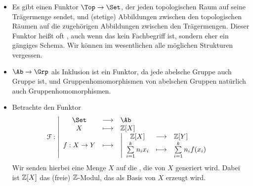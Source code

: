 \begin{example}
    \begin{itemize}
        \item Es gibt einen Funktor $\Top \to  \Set$, der jeden topologischen Raum auf seine Trägermenge sendet, und (stetige) Abbildungen zwischen den topologischen Räumen auf die zugehörigen Abbildungen zwischen den Trägermengen. Dieser Funktor heißt oft , auch wenn das kein Fachbegriff ist, sondern eher ein gängiges Schema. Wir können im wesentlichen alle möglichen Strukturen vergessen. 
        \item $\Ab \to  \Grp$ als Inklusion ist ein Funktor, da jede abelsche Gruppe auch Gruppe ist, und Gruppenhomomorphismen von abelschen Gruppen natürlich auch Gruppenhomomorphismen.
        \item Betrachte den Funktor
                \begin{equation*}
                \mathcal{F}: \left| \begin{array}{c c l} 
                \Set & \longrightarrow & \Ab \\
                X & \longmapsto &  \Z[X] \\
                f: X \to  Y &\longmapsto & 
                    \left| \begin{array}{c c l} 
                        \Z[X] & \longrightarrow & \Z[Y] \\
                        \sum\limits_{i=1}^k n_i x_i& \longmapsto	 & \sum\limits_{i=1}^k n_i f(x_i)
                \end{array} \right.
                
                \end{array} \right.
            \end{equation*}
            Wir senden hierbei eine Menge $X$ auf die  , die von $X$ generiert wird. Dabei ist $\mathbb{Z}[X]$ das (freie) $\mathbb{Z}$-Modul, das als Basis  von $X$ erzeugt wird.
    \end{itemize}
\end{example}
